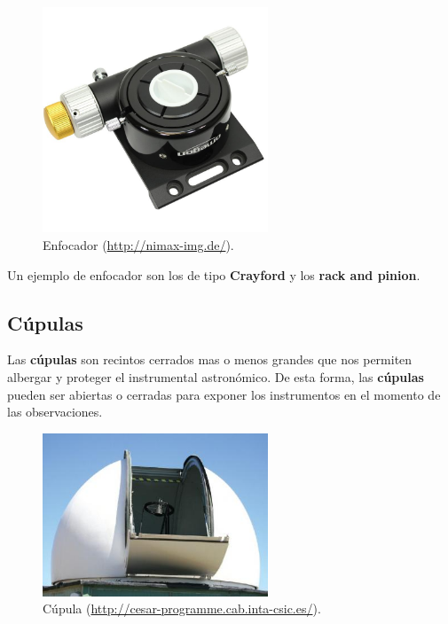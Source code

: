 \bigskip
\begin{figure}[!ht]
  \begin{center}
  \includegraphics[width=0.6\textwidth]{../images/enfocador.jpg}
  \caption[Enfocador]{Enfocador (\href{http://nimax-img.de/}{http://nimax-img.de/}).}
  \label{fig:diag_scrum}
  \end{center}
\end{figure}

\bigskip
Un ejemplo de enfocador son los de tipo \textbf{Crayford} y los \textbf{rack and pinion}.

\subsection{Cúpulas}
Las \textbf{cúpulas} son recintos cerrados mas o menos grandes que nos permiten albergar y proteger el instrumental astronómico. De esta forma, las \textbf{cúpulas} pueden ser abiertas o cerradas para exponer los instrumentos en el momento de las observaciones.

\bigskip
\begin{figure}[!ht]
  \begin{center}
  \includegraphics[width=0.6\textwidth]{../images/cupula.jpg}
  \caption[Cúpula]{Cúpula (\href{http://cesar-programme.cab.inta-csic.es/}{http://cesar-programme.cab.inta-csic.es/}).}
  \label{fig:diag_scrum}
  \end{center}
\end{figure}

